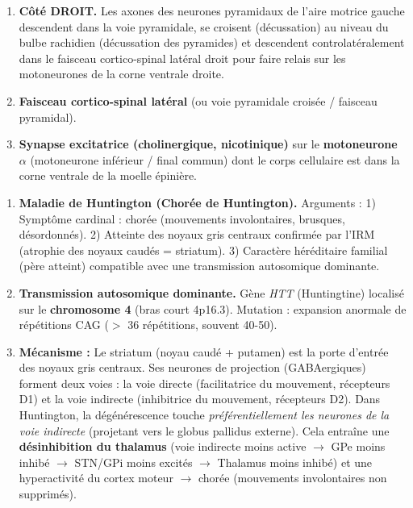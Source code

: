 \documentclass[11pt]{article}
\newcommand{\cle}[1]{{\popxbold\color{popdark}#1}}
\begin{document}
\begin{corrige}[Exercice 2]
\begin{enumerate}
\item \textbf{Côté DROIT.} Les axones des neurones pyramidaux de l'aire motrice gauche descendent dans la voie pyramidale, se croisent (décussation) au niveau du bulbe rachidien (décussation des pyramides) et descendent controlatéralement dans le faisceau cortico-spinal latéral droit pour faire relais sur les motoneurones de la corne ventrale droite.
\item \textbf{Faisceau cortico-spinal latéral} (ou voie pyramidale croisée / faisceau pyramidal).
\item \textbf{Synapse excitatrice (cholinergique, nicotinique)} sur le \textbf{motoneurone $\alpha$} (motoneurone inférieur / final commun) dont le corps cellulaire est dans la corne ventrale de la moelle épinière.
\end{enumerate}
\end{corrige}

\begin{corrige}[Exercice 3]
\begin{enumerate}
\item \textbf{Maladie de Huntington (Chorée de Huntington).} Arguments : 1) Symptôme cardinal : chorée (mouvements involontaires, brusques, désordonnés). 2) Atteinte des noyaux gris centraux confirmée par l'IRM (atrophie des noyaux caudés = striatum). 3) Caractère héréditaire familial (père atteint) compatible avec une transmission autosomique dominante.
\item \textbf{Transmission autosomique dominante.} Gène \emph{HTT} (Huntingtine) localisé sur le \textbf{chromosome 4} (bras court 4p16.3). Mutation : expansion anormale de répétitions CAG ($>$ 36 répétitions, souvent 40-50).
\item \textbf{Mécanisme :} Le striatum (noyau caudé + putamen) est la porte d'entrée des noyaux gris centraux. Ses neurones de projection (GABAergiques) forment deux voies : la voie directe (facilitatrice du mouvement, récepteurs D1) et la voie indirecte (inhibitrice du mouvement, récepteurs D2). Dans Huntington, la dégénérescence touche \emph{préférentiellement les neurones de la voie indirecte} (projetant vers le globus pallidus externe). Cela entraîne une \textbf{désinhibition du thalamus} (voie indirecte moins active $\rightarrow$ GPe moins inhibé $\rightarrow$ STN/GPi moins excités $\rightarrow$ Thalamus moins inhibé) et une hyperactivité du cortex moteur $\rightarrow$ \cle{chorée} (mouvements involontaires non supprimés).
\end{enumerate}
\end{corrige}
\end{document}
